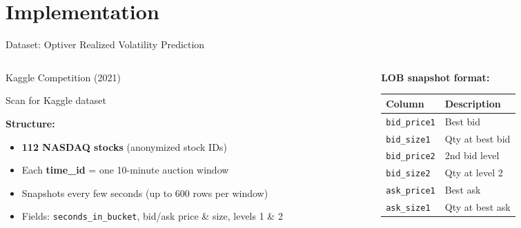 \documentclass[aspectratio=169, 10pt]{beamer}
\begin{document}
\section{Implementation}

\begin{frame}{Dataset: Optiver Realized Volatility Prediction}
  \begin{columns}[T]
    \begin{column}{0.5\textwidth}
      \begin{block}{Kaggle Competition (2021)}
        \begin{center}

          \vspace{0.3cm}
          \scriptsize Scan for Kaggle dataset
        \end{center}
      \end{block}

      \medskip
      \textbf{Structure:}
      \begin{itemize}\small
        \item \textbf{112 NASDAQ stocks} (anonymized stock IDs)
        \item Each \textbf{time\_id} = one 10-minute auction window
        \item Snapshots every few seconds (up to 600 rows per window)
        \item Fields: \texttt{seconds\_in\_bucket}, bid/ask price \& size, levels 1 \& 2
      \end{itemize}
    \end{column}
    \begin{column}{0.44\textwidth}
      \textbf{LOB snapshot format:}

      \medskip
      \renewcommand{\arraystretch}{1.2}
      \begin{tabular}{ll}
        \toprule
        Column & Description \\
        \midrule
        \texttt{bid\_price1} & Best bid \\
        \texttt{bid\_size1}  & Qty at best bid \\
        \texttt{bid\_price2} & 2nd bid level \\
        \texttt{bid\_size2}  & Qty at level 2 \\
        \texttt{ask\_price1} & Best ask \\
        \texttt{ask\_size1}  & Qty at best ask \\
        \bottomrule
      \end{tabular}


\end{column}
\end{columns}
\end{frame}
\end{document}
